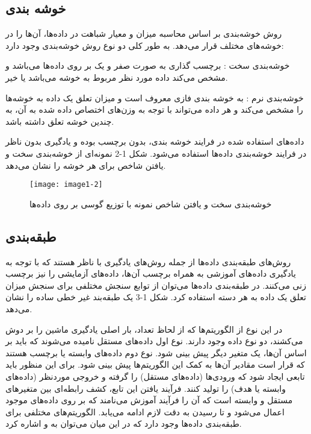 \subsection{ خوشه بندی }
روش خوشه‌بندی بر اساس محاسبه میزان و معیار شباهت در داده‌ها، آن‌ها را در خوشه‌های مختلف قرار می‌دهد. به طور کلی دو نوع روش خوشه‌بندی وجود دارد:

\noindent
خوشه‌بندی سخت : برچسب گذاری به صورت صفر و یک بر روی داده‌ها می‌باشد و مشخص می‌كند داده مورد نظر مربوط به خوشه می‌باشد یا خیر.

\noindent
خوشه‌بندی نرم : به خوشه بندی فازی معروف است و میزان تعلق یک داده به خوشه‌ها را مشخص می‌کند و هر داده می‌تواند با توجه به وزن‌های اختصاص داده شده به آن، به چندین خوشه تعلق داشته باشد.

\noindent
داده‌های استفاده شده در فرایند خوشه بندی، بدون برچسب بوده و یادگیری بدون ناظر  در فرایند خوشه‌بندی داده‌ها استفاده می‌شود. شكل 1-2 نمونه‌ای از خوشه‌بندی سخت و یافتن شاخص برای هر خوشه را نشان می‌دهد.
\begin{figure}[!h]
\centering
\texttt{[image: image1-2]}
\caption{ خوشه‌بندی سخت و یافتن شاخص نمونه با توزیع گوسی بر روی داده‌ها \cite{ref20}}\label{image1-2}
\end{figure}

\subsection{طبقه‌بندی}
روش‌های طبقه‌بندی داده‌ها از جمله روش‌های یادگیری با ناظر  هستند که با توجه به یادگیری داده‌های آموزشی به همراه برچسب آن‌ها، داده‌های آزمایشی را نیز برچسب زنی می‌کنند. در طبقه‌بندی داده‌ها می‌توان از توابع سنجش مختلفی برای سنجش میزان تعلق یک داده به هر دسته استفاده کرد. شکل 1-3 یک طبقه‌بند غیر خطی ساده را نشان می‌دهد.

\noindent
در این نوع از الگوریتم‌ها که از لحاظ تعداد، بار اصلی یادگیری ماشین را بر دوش می‌کشند، دو نوع داده وجود دارند. نوع اول داده‌های مستقل نامیده می‌شوند که باید بر اساس آن‌ها، یک متغیر دیگر پیش بینی شود. نوع دوم داده‌های وابسته یا برچسب هستند که قرار است مقادیر آن‌ها به کمک این الگوریتم‌ها پیش بینی شود. برای این منظور باید تابعی ایجاد شود که ورودی‌ها (داده‌های مستقل) را گرفته و خروجی موردنظر (داده‌های وابسته یا هدف) را تولید کنند. فرآیند یافتن این تابع، کشف رابطه‌ای بین متغیرهای مستقل و وابسته است که آن را فرآیند آموزش می‌نامند که بر روی داده‌های موجود اعمال می‌شود و تا رسیدن به دقت لازم ادامه می‌یابد. الگوریتم‌های مختلفی برای طبقه‌بندی داده‌ها وجود دارد که در این میان می‌توان به  و  اشاره کرد.

